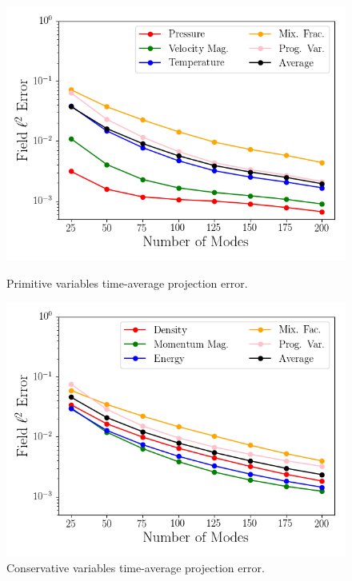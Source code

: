 \begin{figure}
	\begin{minipage}{0.48\linewidth}
		\includegraphics[width=0.99\linewidth,trim={0.5em 0.5em 0.5em 0.5em},clip]{Chapters/HPROMResults/Images/cvrc/projection_error_primitive.png}
		\caption{\label{fig:cvrcProjErrPrim}Primitive variables time-average projection error.}
	\end{minipage} \hspace{0.5em}
	\begin{minipage}{0.48\linewidth}
		\includegraphics[width=0.99\linewidth,trim={0.5em 0.5em 0.5em 0.5em},clip]{Chapters/HPROMResults/Images/cvrc/projection_error_conservative.png}
		\caption{\label{fig:cvrcProjErrCons}Conservative variables time-average projection error.}
	\end{minipage}
\end{figure}

